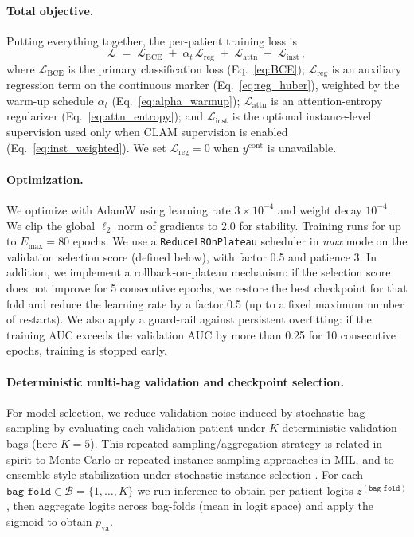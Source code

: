\paragraph{Total objective.}
Putting everything together, the per-patient training loss is
\begin{equation}\label{eq:loss_total}
\mathcal{L} \;=\; \mathcal{L}_{\text{BCE}} \;+\; \alpha_t\,\mathcal{L}_{\text{reg}} \;+\; \mathcal{L}_{\text{attn}} \;+\; \mathcal{L}_{\text{inst}}\,,
\end{equation}
where $\mathcal{L}_{\text{BCE}}$ is the primary classification loss (Eq.~\ref{eq:BCE}); $\mathcal{L}_{\text{reg}}$ is an auxiliary regression term on the continuous marker (Eq.~\ref{eq:reg_huber}), weighted by the warm-up schedule $\alpha_t$ (Eq.~\ref{eq:alpha_warmup}); $\mathcal{L}_{\text{attn}}$ is an attention-entropy regularizer (Eq.~\ref{eq:attn_entropy}); and $\mathcal{L}_{\text{inst}}$ is the optional instance-level supervision used only when CLAM supervision is enabled (Eq.~\ref{eq:inst_weighted}).
 We set $\mathcal{L}_{\text{reg}}=0$ when $y^{\text{cont}}$ is unavailable.

\paragraph{Optimization.}
We optimize with AdamW using learning rate $3\times 10^{-4}$ and weight decay $10^{-4}$. We clip the global $\ell_2$ norm of gradients to 2.0 for stability. Training runs for up to $E_{\max}=80$ epochs. We use a \texttt{ReduceLROnPlateau} scheduler in \emph{max} mode on the validation selection score (defined below), with factor 0.5 and patience 3. In addition, we implement a rollback-on-plateau mechanism: if the selection score does not improve for 5 consecutive epochs, we restore the best checkpoint for that fold and reduce the learning rate by a factor 0.5 (up to a fixed maximum number of restarts). We also apply a guard-rail against persistent overfitting: if the training AUC exceeds the validation AUC by more than 0.25 for 10 consecutive epochs, training is stopped early.

\paragraph{Deterministic multi-bag validation and checkpoint selection.}
For model selection, we reduce validation noise induced by stochastic bag sampling by evaluating each validation patient under $K$ deterministic validation bags (here $K=5$). This repeated-sampling/aggregation strategy is related in spirit to Monte-Carlo or repeated instance sampling approaches in MIL, and to ensemble-style stabilization under stochastic instance selection \cite{combalia2018montecarloMIL,carbonneau2016rsis}. For each $\texttt{bag\_fold}\in\mathcal{B}=\{1,\dots,K\}$ we run inference to obtain per-patient logits $z^{(\texttt{bag\_fold})}$, then aggregate logits across bag-folds (mean in logit space) and apply the sigmoid to obtain $p_{\text{va}}$.

